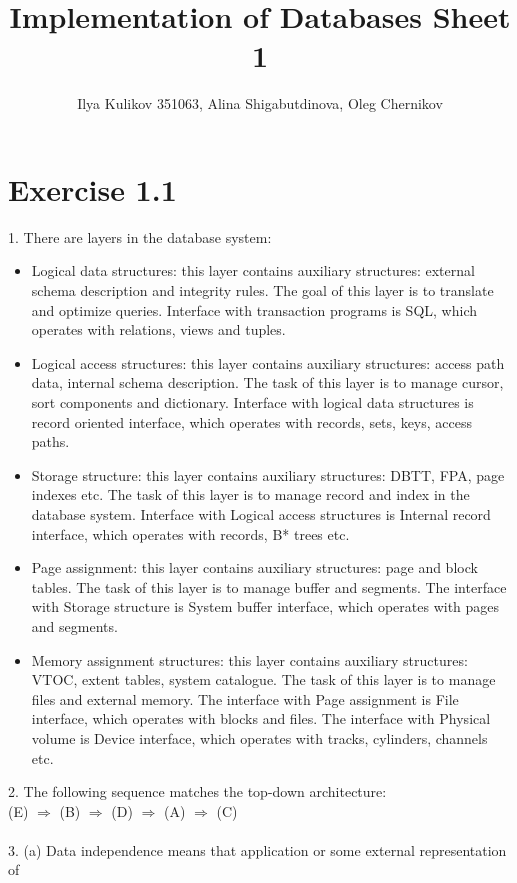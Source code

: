 \documentclass[10pt]{article}
\title{Implementation of Databases Sheet 1}
\author{Ilya Kulikov 351063, Alina Shigabutdinova, Oleg Chernikov}
\begin{document}
  \maketitle
  \section*{Exercise 1.1}
  1. There are layers in the database system:
  \begin{itemize}
    \item Logical data structures: this layer contains auxiliary structures:
    external schema description and integrity rules. The goal of this layer is
    to translate and optimize queries. Interface with transaction programs is
    SQL, which operates with relations, views and tuples.
    \item Logical access structures: this layer contains auxiliary structures:
    access path data, internal schema description. The task of this layer is to
    manage cursor, sort components and dictionary. Interface with logical data
    structures is record oriented interface, which operates with records, sets,
    keys, access paths.
    \item Storage structure: this layer contains auxiliary structures: DBTT, FPA,
    page indexes etc. The task of this layer is to manage record and index in the
    database system. Interface with Logical access structures is Internal record
    interface, which operates with records, B* trees etc.
    \item Page assignment: this layer contains auxiliary structures: page and
    block tables. The task of this layer is to manage buffer and segments. The
    interface with Storage structure is System buffer interface, which operates
    with pages and segments.
    \item Memory assignment structures: this layer contains auxiliary structures:
    VTOC, extent tables, system catalogue. The task of this layer is to manage files
    and external memory. The interface with Page assignment is File interface,
    which operates with blocks and files. The interface with Physical volume is
    Device interface, which operates with tracks, cylinders, channels etc.
  \end{itemize}
  2. The following sequence matches the top-down architecture:\\
  (E) $\Rightarrow$ (B) $\Rightarrow$ (D) $\Rightarrow$ (A) $\Rightarrow$ (C)\\\\
  3. (a) Data independence means that application or some external representation of
\end{document}
